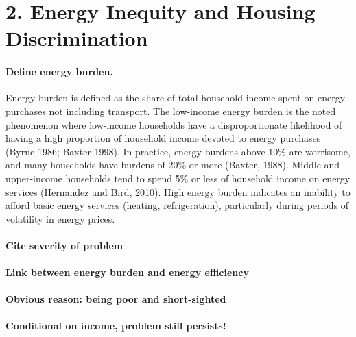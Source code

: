 \documentclass[
]{article}
\begin{document}
\hypertarget{energy-inequity-and-housing-discrimination}{%
\section{2. Energy Inequity and Housing
Discrimination}\label{energy-inequity-and-housing-discrimination}}

\hypertarget{define-energy-burden.}{%
\paragraph{Define energy burden.}\label{define-energy-burden.}}

Energy burden is defined as the share of total household income spent on
energy purchases not including transport. The low-income energy burden
is the noted phenomenon where low-income households have a
disproportionate likelihood of having a high proportion of household
income devoted to energy purchases (Byrne 1986; Baxter 1998). In
practice, energy burdens above 10\% are worrisome, and many households
have burdens of 20\% or more (Baxter, 1988). Middle and upper-income
households tend to spend 5\% or less of household income on energy
services (Hernandez and Bird, 2010). High energy burden indicates an
inability to afford basic energy services (heating, refrigeration),
particularly during periods of volatility in energy prices.

\hypertarget{cite-severity-of-problem}{%
\paragraph{Cite severity of problem}\label{cite-severity-of-problem}}

\hypertarget{link-between-energy-burden-and-energy-efficiency}{%
\paragraph{Link between energy burden and energy
efficiency}\label{link-between-energy-burden-and-energy-efficiency}}

\hypertarget{obvious-reason-being-poor-and-short-sighted}{%
\paragraph{Obvious reason: being poor and
short-sighted}\label{obvious-reason-being-poor-and-short-sighted}}

\hypertarget{conditional-on-income-problem-still-persists}{%
\paragraph{Conditional on income, problem still
persists!}\label{conditional-on-income-problem-still-persists}}
\end{document}
